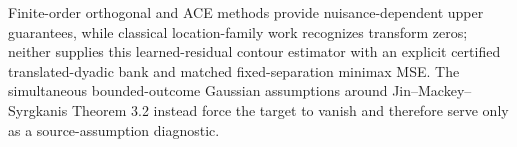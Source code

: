 Finite-order orthogonal and ACE methods provide nuisance-dependent upper guarantees, while classical location-family work recognizes transform zeros; neither supplies this learned-residual contour estimator with an explicit certified translated-dyadic bank and matched fixed-separation minimax MSE.  The simultaneous bounded-outcome Gaussian assumptions around Jin--Mackey--Syrgkanis Theorem 3.2 instead force the target to vanish and therefore serve only as a source-assumption diagnostic.